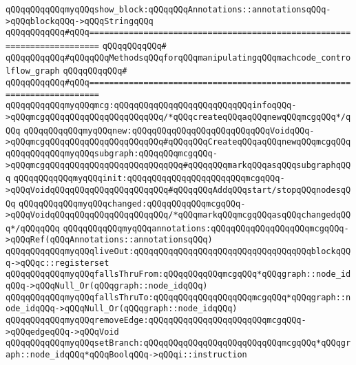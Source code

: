 \verb|qQQqqQQqqQQqmyqQQqshow_block:qQQqqQQqAnnotations::annotationsqQQq->qQQqblockqQQq->qQQqStringqQQq|\newline
\newline
\verb|qQQqqQQqqQQq#qQQq========================================================================|\newline
\verb|qQQqqQQqqQQq#|\newline
\verb|qQQqqQQqqQQq#qQQqqQQqMethodsqQQqforqQQqmanipulatingqQQqmachcode_controlflow_graph|\newline
\verb|qQQqqQQqqQQq#|\newline
\verb|qQQqqQQqqQQq#qQQq========================================================================|\newline
\verb|qQQqqQQqqQQqmyqQQqmcg:qQQqqQQqqQQqqQQqqQQqqQQqqQQqinfoqQQq->qQQqmcgqQQqqQQqqQQqqQQqqQQqqQQq/*qQQqcreateqQQqaqQQqnewqQQqmcgqQQq*/qQQq|\newline
\verb|qQQqqQQqqQQqmyqQQqnew:qQQqqQQqqQQqqQQqqQQqqQQqqQQqVoidqQQq->qQQqmcgqQQqqQQqqQQqqQQqqQQqqQQq#qQQqqQQqCreateqQQqaqQQqnewqQQqmcgqQQq|\newline
\verb|qQQqqQQqqQQqmyqQQqsubgraph:qQQqqQQqmcgqQQq->qQQqmcgqQQqqQQqqQQqqQQqqQQqqQQqqQQq#qQQqqQQqmarkqQQqasqQQqsubgraphqQQq|\newline
\verb|qQQqqQQqqQQqmyqQQqinit:qQQqqQQqqQQqqQQqqQQqqQQqmcgqQQq->qQQqVoidqQQqqQQqqQQqqQQqqQQqqQQq#qQQqqQQqAddqQQqstart/stopqQQqnodesqQQq|\newline
\verb|qQQqqQQqqQQqmyqQQqchanged:qQQqqQQqqQQqmcgqQQq->qQQqVoidqQQqqQQqqQQqqQQqqQQqqQQq/*qQQqmarkqQQqmcgqQQqasqQQqchangedqQQq*/qQQqqQQq|\newline
\newline
\verb|qQQqqQQqqQQqmyqQQqannotations:qQQqqQQqqQQqqQQqqQQqmcgqQQq->qQQqRef(qQQqAnnotations::annotationsqQQq)|\newline
\verb|qQQqqQQqqQQqmyqQQqliveOut:qQQqqQQqqQQqqQQqqQQqqQQqqQQqqQQqqQQqblockqQQq->qQQqc::registerset|\newline
\verb|qQQqqQQqqQQqmyqQQqfallsThruFrom:qQQqqQQqqQQqmcgqQQq*qQQqgraph::node_idqQQq->qQQqNull_Or(qQQqgraph::node_idqQQq)|\newline
\verb|qQQqqQQqqQQqmyqQQqfallsThruTo:qQQqqQQqqQQqqQQqqQQqmcgqQQq*qQQqgraph::node_idqQQq->qQQqNull_Or(qQQqgraph::node_idqQQq)|\newline
\verb|qQQqqQQqqQQqmyqQQqremoveEdge:qQQqqQQqqQQqqQQqqQQqqQQqmcgqQQq->qQQqedgeqQQq->qQQqVoid|\newline
\verb|qQQqqQQqqQQqmyqQQqsetBranch:qQQqqQQqqQQqqQQqqQQqqQQqqQQqmcgqQQq*qQQqgraph::node_idqQQq*qQQqBoolqQQq->qQQqi::instruction|\newline
